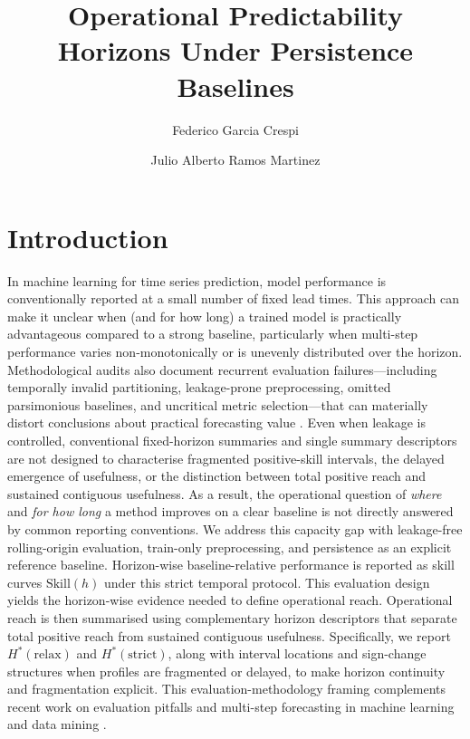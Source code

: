 \documentclass[pdflatex,sn-mathphys]{sn-jnl}
\title[Operational predictability horizons]{Operational Predictability Horizons Under Persistence Baselines}
\author*[1]{Federico Garcia Crespi}
\author[2]{Julio Alberto Ramos Martinez}
\affil[1]{Departamento de Ingenier\'ia de Computadores, Universidad Miguel Hern\'andez, Elche, Spain}
\affil[2]{Unidad de Docencia Online de la UMH, Universidad Miguel Hern\'andez, Elche, Spain (T\'ecnico de Innovaci\'on Docente)}
\begin{document}
\maketitle

\section{Introduction}
In machine learning for time series prediction, model performance is conventionally reported at a small number of fixed lead times. This approach can make it unclear when (and for how long) a trained model is practically advantageous compared to a strong baseline, particularly when multi-step performance varies non-monotonically or is unevenly distributed over the horizon. Methodological audits also document recurrent evaluation failures—including temporally invalid partitioning, leakage-prone preprocessing, omitted parsimonious baselines, and uncritical metric selection—that can materially distort conclusions about practical forecasting value \citep{hewamalage2023dmkd}. Even when leakage is controlled, conventional fixed-horizon summaries and single summary descriptors are not designed to characterise fragmented positive-skill intervals, the delayed emergence of usefulness, or the distinction between total positive reach and sustained contiguous usefulness. As a result, the operational question of \emph{where} and \emph{for how long} a method improves on a clear baseline is not directly answered by common reporting conventions.
We address this capacity gap with leakage-free rolling-origin evaluation, train-only preprocessing, and persistence as an explicit reference baseline. Horizon-wise baseline-relative performance is reported as skill curves $\mathrm{Skill}(h)$ under this strict temporal protocol. This evaluation design yields the horizon-wise evidence needed to define operational reach.
Operational reach is then summarised using complementary horizon descriptors that separate total positive reach from sustained contiguous usefulness. Specifically, we report $H^*(\mathrm{relax})$ and $H^*(\mathrm{strict})$, along with interval locations and sign-change structures when profiles are fragmented or delayed, to make horizon continuity and fragmentation explicit.
This evaluation-methodology framing complements recent work on evaluation pitfalls and multi-step forecasting in machine learning and data mining \citep{hewamalage2023dmkd,green2025stratify,kreuzer2025trend,cerqueira2020,modelradar2025}.
\end{document}
